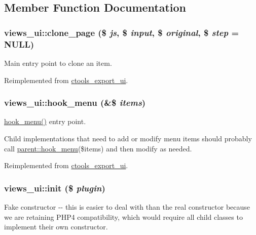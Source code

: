 \subsection{Member Function Documentation}
\hypertarget{classviews__ui_a5c8914e69b780b3257c15e635f39699c}{
\subsubsection[{clone\_\-page}]{\setlength{\rightskip}{0pt plus 5cm}views\_\-ui::clone\_\-page (\$ {\em js}, \/  \$ {\em input}, \/  \$ {\em original}, \/  \$ {\em step} = {\ttfamily NULL})}}
\label{classviews__ui_a5c8914e69b780b3257c15e635f39699c}
Main entry point to clone an item. 

Reimplemented from \hyperlink{classctools__export__ui_a20bcb4d94dd7450de286084cd3dd6e99}{ctools\_\-export\_\-ui}.\hypertarget{classviews__ui_a2a5885b9b860fd53a304e1ac38237a56}{
\subsubsection[{hook\_\-menu}]{\setlength{\rightskip}{0pt plus 5cm}views\_\-ui::hook\_\-menu (\&\$ {\em items})}}
\label{classviews__ui_a2a5885b9b860fd53a304e1ac38237a56}
\hyperlink{classviews__ui_a2a5885b9b860fd53a304e1ac38237a56}{hook\_\-menu()} entry point.

Child implementations that need to add or modify menu items should probably call \hyperlink{group__hooks_ga5c95244fea59b25666e409759e133ded}{parent::hook\_\-menu}(\$items) and then modify as needed. 

Reimplemented from \hyperlink{classctools__export__ui_a5ee980ee59378fdeb612e429e18f08c7}{ctools\_\-export\_\-ui}.\hypertarget{classviews__ui_aaa0602d4d7f77dc16eb57cc910aa87ac}{
\subsubsection[{init}]{\setlength{\rightskip}{0pt plus 5cm}views\_\-ui::init (\$ {\em plugin})}}
\label{classviews__ui_aaa0602d4d7f77dc16eb57cc910aa87ac}
Fake constructor -\/-\/ this is easier to deal with than the real constructor because we are retaining PHP4 compatibility, which would require all child classes to implement their own constructor. 

